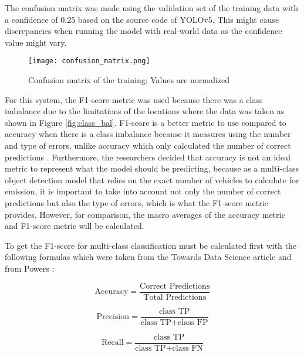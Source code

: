  The confusion matrix was made using the validation set of the training data with a confidence of 0.25 based on the source code of YOLOv5. This might cause discrepancies when running the model with real-world data as the confidence value might vary. 


\begin{figure}[!htbp]
	\texttt{[image: confusion\_matrix.png]}
	\caption{Confusion matrix of the training; Values are normalized}
	\label{fig:con_mat}
\end{figure}
\FloatBarrier

For this system, the F1-score metric was used because there was a class imbalance due to the limitations of the locations where the data was taken as shown in Figure \ref{fig:class_bal}. F1-score is a better metric to use compared to accuracy when there is a class imbalance because it measures using the number and type of errors, unlike accuracy which only calculated the number of correct predictions \cite{Korstanje_2021}. Furthermore, the researchers decided that accuracy is not an ideal metric to represent what the model should be predicting, because as a multi-class object detection model that relies on the exact number of vehicles to calculate for emission, it is important to take into account not only the number of correct predictions but also the type of errors, which is what the F1-score metric provides. However, for comparison, the macro averages of the accuracy metric and F1-score metric will be calculated.  




To get the F1-score for multi-class classification must be calculated first with the following formulas which were taken from the Towards Data Science article \cite{Korstanje_2021} and from Powers \citeyear{D_Powers}:

\begin{equation} \label{eq:accuracy}
	{\text{Accuracy}}= \frac{\text{Correct Predictions}}{\text{Total Predictions}} 
\end{equation}


\begin{equation} \label{eq:[precision]}
{\text{Precision}}= \frac{\text{class TP}}{\text{class TP}+\text{class FP}} 
\end{equation}

\begin{equation} \label{eq:recall}
{\text{Recall}}= \frac{\text{class TP}}{\text{class TP}+\text{class FN}} 
\end{equation}


